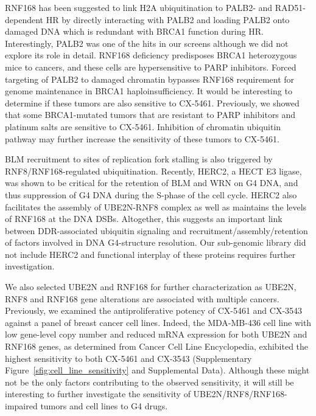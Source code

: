 RNF168 has been suggested to link H2A ubiquitination to PALB2- and RAD51-dependent HR by directly interacting with PALB2 and loading PALB2 onto damaged DNA which is redundant with BRCA1 function during HR\cite{zhang2009,Zhang2009a,sy2009,Luijsterburg2017a}. Interestingly, PALB2 was one of the hits in our screens although we did not explore its role in detail. RNF168 deficiency predisposes BRCA1 heterozygous mice to cancers, and these cells are  hypersensitive to PARP inhibitors\cite{zong2019}. Forced targeting of PALB2 to damaged chromatin bypasses RNF168 requirement for genome maintenance in BRCA1 haploinsufficiency. It would be interesting to determine if these tumors are also sensitive to CX-5461.  Previously, we showed that some BRCA1-mutated tumors that are resistant to PARP inhibitors and platinum salts are sensitive to  CX-5461\cite{Xu2017}. Inhibition of chromatin ubiquitin pathway may further increase the sensitivity of these tumors to CX-5461.
  
BLM recruitment to sites of replication fork stalling is also triggered by RNF8/RNF168-regulated ubiquitination\cite{Tikoo2013,Tripathi2018}. Recently, HERC2, a HECT E3 ligase, was shown to be critical for the retention of BLM and WRN on G4 DNA, and thus suppression of G4 DNA during the S-phase of the cell cycle\cite{Wu2018}. HERC2 also facilitates the assembly of UBE2N-RNF8 complex as well as maintains the levels of RNF168 at the DNA DSBs\cite{Bekker-Jensen2010}. Altogether, this suggests an important link between DDR-associated ubiquitin signaling and recruitment/assembly/retention of factors involved in DNA G4-structure resolution. Our sub-genomic library did not include HERC2 and functional interplay of these proteins requires further investigation. 

We also selected UBE2N and RNF168 for further characterization as UBE2N, RNF8 and RNF168 gene alterations are associated with multiple cancers. Previously, we examined the antiproliferative potency of CX-5461 and CX-3543 against a panel of breast cancer cell lines\cite{Xu2017}. Indeed, the MDA-MB-436 cell line with low gene-level copy number and reduced mRNA expression for both UBE2N and RNF168 genes, as determined from Cancer Cell Line Encyclopedia, exhibited the highest sensitivity to both CX-5461 and CX-3543 (Supplementary Figure~\ref{sfig:cell_line_sensitivity} and Supplemental Data)\cite{Barretina2012,Xu2017}. Although these might not be the only factors contributing to the observed sensitivity, it will still be interesting to further investigate the sensitivity of UBE2N/RNF8/RNF168-impaired tumors and cell lines to G4 drugs. 

